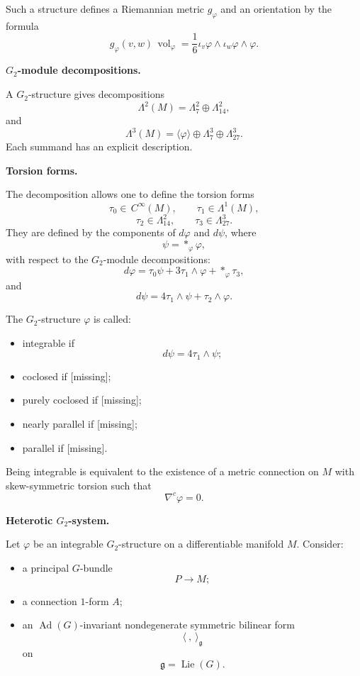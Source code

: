 Such a structure defines a Riemannian
metric $g_\varphi$ and an orientation
by the formula
\[
        g_\varphi(v,w)\,
        \operatorname{vol}_\varphi
        =
        \frac{1}{6}
        \iota_v\varphi\wedge
        \iota_w\varphi\wedge\varphi .
\]

\medskip\noindent
{\bf $G_2$-module decompositions.}

A $G_2$-structure gives
decompositions
\[
        \Lambda^2(M)
        =
        \Lambda^2_7
        \oplus
        \Lambda^2_{14},
\]
and
\[
        \Lambda^3(M)
        =
        \langle\varphi\rangle
        \oplus
        \Lambda^3_7
        \oplus
        \Lambda^3_{27}.
\]
Each summand has an explicit
description.

\medskip\noindent
{\bf Torsion forms.}

The decomposition allows one to define
the torsion forms
\[
        \tau_0\in\, C^\infty(M),
        \qquad
        \tau_1\in\Lambda^1(M),
\]
\[
        \tau_2\in\Lambda^2_{14},
        \qquad
        \tau_3\in\Lambda^3_{27}.
\]
They are defined by the components of
$d\varphi$ and $d\psi$, where
\[
        \psi=*_\varphi\varphi,
\]
with respect to the $G_2$-module
decompositions:
\[
        d\varphi
        =
        \tau_0\psi
        +
        3\tau_1\wedge\varphi
        +
        *_\varphi\tau_3,
\]
and
\[
        d\psi
        =
        4\tau_1\wedge\psi
        +
        \tau_2\wedge\varphi .
\]

The $G_2$-structure $\varphi$ is
called:
\begin{itemize}
\item integrable if
\[
        d\psi=4\tau_1\wedge\psi;
\]
\item coclosed if [missing];
\item purely coclosed if [missing];
\item nearly parallel if [missing];
\item parallel if [missing].
\end{itemize}

\begin{theorem}
\label{theorem-being-integrable}
Being integrable is equivalent to the
existence of a metric connection on
$M$ with skew-symmetric torsion such
that
\[
        \nabla^c\varphi=0.
\]
\end{theorem}

\medskip\noindent
{\bf Heterotic $G_2$-system.}

Let $\varphi$ be an integrable
$G_2$-structure on a differentiable
manifold $M$.
Consider:
\begin{itemize}
\item a principal $G$-bundle
\[
        P\to M;
\]
\item a connection $1$-form $A$;
\item an
$\operatorname{Ad}(G)$-invariant
nondegenerate symmetric bilinear form
\[
        \langle\ ,\ \rangle_{\mathfrak g}
\]
on
\[
        \mathfrak g=\operatorname{Lie}(G).
\]
\end{itemize}

